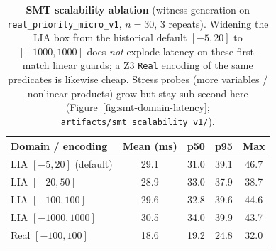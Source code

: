 \begin{table}[t]
  \centering
  \caption{\textbf{SMT scalability ablation}
    (witness generation on \texttt{real\_priority\_micro\_v1}, $n{=}30$,
    3 repeats). Widening the LIA box from the historical default
    $[-5,20]$ to $[-1000,1000]$ does \emph{not} explode latency on these
    first-match linear guards; a Z3 \texttt{Real} encoding of the same
    predicates is likewise cheap. Stress probes (more variables /
    nonlinear products) grow but stay sub-second here
    (Figure~\ref{fig:smt-domain-latency};
    \texttt{artifacts/smt\_scalability\_v1/}).}
  \label{tab:smt-scalability}
  \footnotesize
  \renewcommand{\arraystretch}{1.12}
  \begin{tabular}{@{}lcccc@{}}
    \toprule
    Domain / encoding & Mean (ms) & p50 & p95 & Max \\
    \midrule
    LIA $[-5,20]$ (default) & 29.1 & 31.0 & 39.1 & 46.7 \\
    LIA $[-20,50]$ & 28.9 & 33.0 & 37.9 & 38.7 \\
    LIA $[-100,100]$ & 29.6 & 32.8 & 39.6 & 44.6 \\
    LIA $[-1000,1000]$ & 30.5 & 34.0 & 39.9 & 43.7 \\
    Real $[-100,100]$ & 18.6 & 19.2 & 24.8 & 32.0 \\
    \bottomrule
  \end{tabular}
\end{table}
